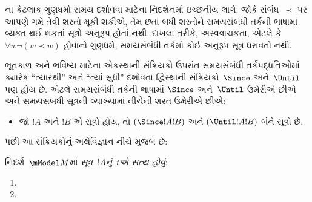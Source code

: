 ના કેટલાક ગુણધર્મો સમય દર્શાવવા માટેના
નિદર્શનમાં ઇચ્છનીય લાગે. જોકે સંબંધ~$\prec$ પર આપણે ગમે તેવી
શરતો મૂકી શકીએ, તેમ છતાં બધી શરતોને સમયસંબંધી તર્કની ભાષામાં
વ્યક્ત થઈ શકતાં સૂત્રો અનુરૂપ હોતાં નથી. દાખલા તરીકે,
અસ્વવાચકતા, એટલે કે $\forall w \lnot (w \prec w)$ હોવાનો
ગુણધર્મ, સમયસંબંધી તર્કમાં કોઈ અનુરૂપ સૂત્ર ધરાવતો નથી.
\endgroup

\begingroup
\makeatletter{}\makeatother


\label{guunit:OLP-0480}


ભૂતકાળ અને ભવિષ્ય માટેના એકસ્થાની સંક્રિયકો ઉપરાંત સમયસંબંધી
તર્કપદ્ધતિઓમાં ક્યારેક ``ત્યારથી'' અને ``ત્યાં સુધી'' દર્શાવતા
દ્વિસ્થાની સંક્રિયકો~$\Since $ અને~$\Until$ પણ હોય છે. એટલે
સમયસંબંધી તર્કની ભાષામાં $\Since $ અને~$\Until$ ઉમેરીએ છીએ અને
સમયસંબંધી સૂત્રની વ્યાખ્યામાં નીચેની શરત ઉમેરીએ છીએ:

\begin{itemize}
\item[] જો $!A$ અને $!B$ એ સૂત્રો હોય, તો $(\Since  !A !B)$ અને
  $(\Until !A !B)$ બંને સૂત્રો છે.
\end{itemize}

પછી આ સંક્રિયકોનું અર્થવિજ્ઞાન નીચે મુજબ છે:

\begin{defn}
  નિદર્શ~$\mModel M$માં \emph{સૂત્ર~$!A$નું~$t$એ સત્ય હોવું}:
  \begin{enumerate}
  \item{} 
   \item{} 
  \end{enumerate} 
\end{defn}


